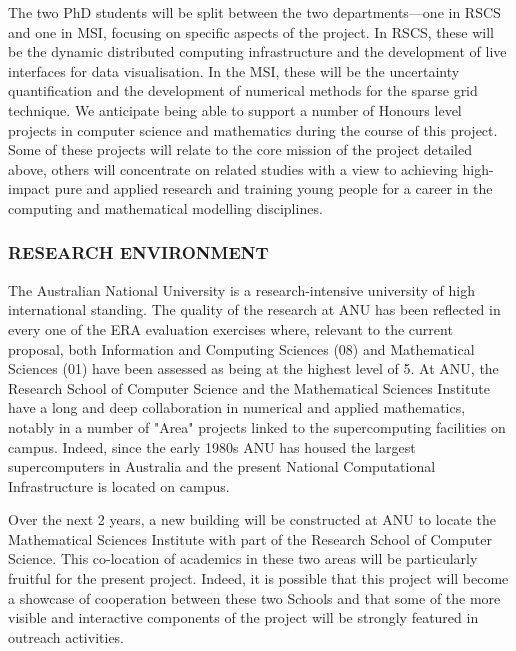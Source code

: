 \documentclass[a4paper,fontsize=13pt]{scrartcl}
\begin{document}
The two  PhD students will be split between the two departments---one
in RSCS and one in MSI, focusing on specific aspects of the project.
In RSCS, these will be the dynamic distributed computing
infrastructure and the development of live interfaces for data
visualisation. In the MSI, these will be the uncertainty
quantification and the development of numerical methods for the sparse
grid technique. We anticipate being able to support a number of Honours level projects in computer science and mathematics during the course of this project. Some of these projects will relate to the core mission of the project detailed above, others will concentrate on related studies with a view to achieving high-impact pure and applied research and training young people for a career in the computing and mathematical modelling disciplines.

\subsubsection*{RESEARCH ENVIRONMENT}

The Australian National University is a research-intensive university of high international standing. The quality of the research at ANU has been reflected in every one of the ERA evaluation exercises where, relevant to the current proposal, both Information and Computing Sciences (08) and Mathematical Sciences (01) have been assessed as being at the highest level of 5. At ANU, the Research School of Computer Science and the Mathematical Sciences Institute have a long and deep collaboration in numerical and applied mathematics, notably in a number of "Area" projects linked to the supercomputing facilities on campus. Indeed, since the early 1980s ANU has housed the largest supercomputers in Australia and the present National Computational Infrastructure is located on campus. 

Over the next 2 years, a new building will be constructed at ANU to locate the Mathematical Sciences Institute with part of the Research School of Computer Science. This co-location of academics in these two areas will be particularly fruitful for the present project. Indeed, it is possible that this project will become a showcase of cooperation between these two Schools and that some of the more visible and interactive components of the project will be strongly featured in outreach activities. 
\end{document}
